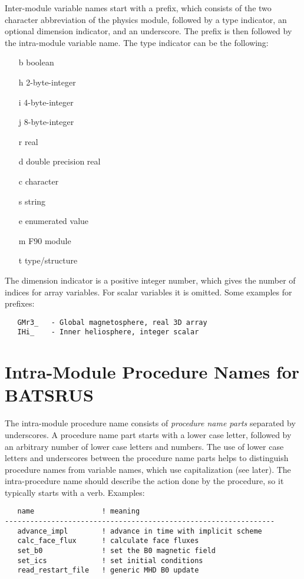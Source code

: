 Inter-module variable names start with a prefix, which
consists of the two character abbreviation of the physics module,
followed by a type indicator, an optional dimension indicator,
and an underscore. The prefix is then followed by the
intra-module variable name. The type indicator can be
the following:
\begin{itemize}
\item[b] boolean
\item[h] 2-byte-integer
\item[i] 4-byte-integer
\item[j] 8-byte-integer
\item[r] real
\item[d] double precision real
\item[c] character
\item[s] string
\item[e] enumerated value
\item[m] F90 module
\item[t] type/structure
\end{itemize}
The dimension indicator is a positive integer number, which
gives the number of indices for array variables. For scalar
variables it is omitted. Some examples for prefixes:
\begin{verbatim}
   GMr3_   - Global magnetosphere, real 3D array
   IHi_    - Inner heliosphere, integer scalar
\end{verbatim}

\section{Intra-Module Procedure Names for BATSRUS}

The intra-module procedure name consists of 
{\it procedure name parts} separated by underscores. 
A procedure name part starts with a lower case letter, followed
by an arbitrary number of lower case letters and numbers.
The use of lower case letters and underscores between the procedure 
name parts helps to distinguish procedure names from variable names, 
which use capitalization (see later).
The intra-procedure name should describe the action done
by the procedure, so it typically starts with a verb. Examples:
\begin{verbatim}
   name                ! meaning
----------------------------------------------------------------
   advance_impl        ! advance in time with implicit scheme
   calc_face_flux      ! calculate face fluxes
   set_b0              ! set the B0 magnetic field
   set_ics             ! set initial conditions
   read_restart_file   ! generic MHD B0 update
\end{verbatim}

